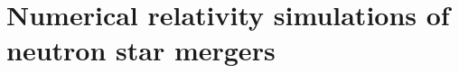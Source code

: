 \documentclass[
12pt, %
english, %
onehalfspacing, %
nohyperref, %
headsepline, %
]{MastersDoctoralThesis} %
\begin{document}

\mainmatter %

\pagestyle{thesis} %


\part{Numerical relativity simulations of neutron star mergers}
%
% 
% 
 
% 



\appendix %

%
%
%
%
%



\printbibliography[heading=bibintoc]

\end{document}
